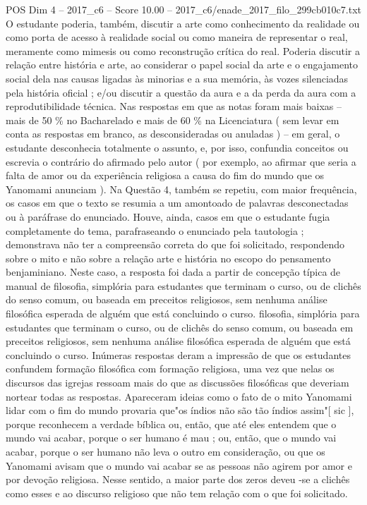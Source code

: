 \begin{textsample}{POS Dim 4 – 2017\_c6 – Score 10.00 – 2017\_c6/enade\_2017\_filo\_299cb010c7.txt}
O estudante poderia, também, discutir a arte como conhecimento da realidade ou como porta de acesso à realidade social ou como maneira de representar o real, meramente como mimesis ou como reconstrução crítica do real.
Poderia discutir a relação entre história e arte, ao considerar o papel social da arte e o engajamento social dela nas causas ligadas às minorias e a sua memória, às vozes silenciadas pela história oficial ; e/ou discutir a questão da aura e a da perda da aura com a reprodutibilidade técnica.
Nas respostas em que as notas foram mais baixas – mais de 50 \% no Bacharelado e mais de 60 \% na Licenciatura ( sem levar em conta as respostas em branco, as desconsideradas ou anuladas ) – em geral, o estudante desconhecia totalmente o assunto, e, por isso, confundia conceitos ou escrevia o contrário do afirmado pelo autor ( por exemplo, ao afirmar que seria a falta de amor ou da experiência religiosa a causa do fim do mundo que os Yanomami anunciam ).
Na Questão 4, também se repetiu, com maior frequência, os casos em que o texto se resumia a um amontoado de palavras desconectadas ou à paráfrase do enunciado.
Houve, ainda, casos em que o estudante fugia completamente do tema, parafraseando o enunciado pela tautologia ; demonstrava não ter a compreensão correta do que foi solicitado, respondendo sobre o mito e não sobre a relação arte e história no escopo do pensamento benjaminiano.
Neste caso, a resposta foi dada a partir de concepção típica de manual de filosofia, simplória para estudantes que terminam o curso, ou de clichês do senso comum, ou baseada em preceitos religiosos, sem nenhuma análise filosófica esperada de alguém que está concluindo o curso. filosofia, simplória para estudantes que terminam o curso, ou de clichês do senso comum, ou baseada em preceitos religiosos, sem nenhuma análise filosófica esperada de alguém que está concluindo o curso.
Inúmeras respostas deram a impressão de que os estudantes confundem formação filosófica com formação religiosa, uma vez que nelas os discursos das igrejas ressoam mais do que as discussões filosóficas que deveriam nortear todas as respostas.
Apareceram ideias como o fato de o mito Yanomami lidar com o fim do mundo provaria que"os índios não são tão índios assim"[ sic ], porque reconhecem a verdade bíblica ou, então, que até eles entendem que o mundo vai acabar, porque o ser humano é mau ; ou, então, que o mundo vai acabar, porque o ser humano não leva o outro em consideração, ou que os Yanomami avisam que o mundo vai acabar se as pessoas não agirem por amor e por devoção religiosa.
Nesse sentido, a maior parte dos zeros deveu -se a clichês como esses e ao discurso religioso que não tem relação com o que foi solicitado.

\end{textsample}

